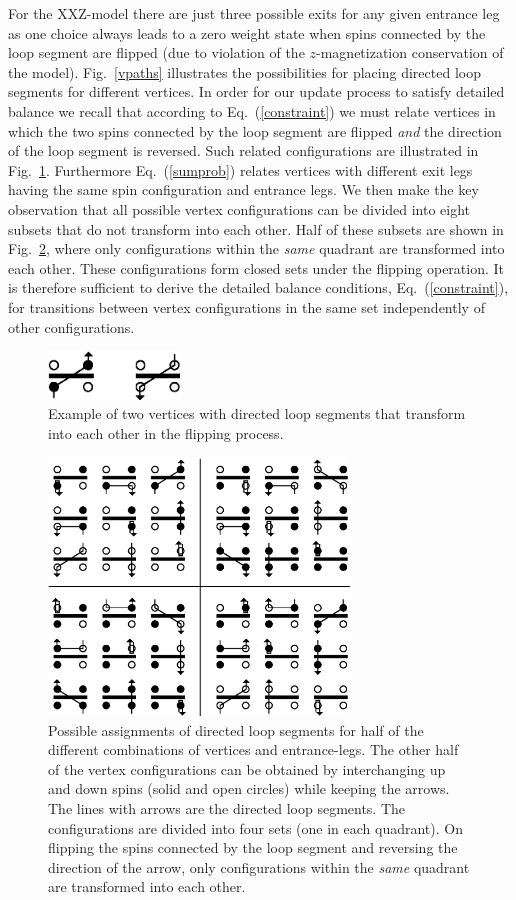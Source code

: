 \documentclass[10pt,pre,aps,twocolumn,showpacs,superscriptaddress,
floatfix]{revtex4}
\begin{document}
For the XXZ-model there are just three possible exits for any given entrance 
leg as one  choice always leads to a zero weight state when spins connected by
the loop segment are flipped (due to violation of the $z$-magnetization 
conservation of the model). Fig.~\ref{vpaths} illustrates the possibilities 
for placing directed loop segments for different vertices. 
In order for our update process to satisfy detailed balance we recall that
according to Eq.~(\ref{constraint}) we must relate vertices 
in which the two spins connected by the 
loop segment are flipped {\it and} the direction of the loop segment is 
reversed. Such related configurations are illustrated in Fig.~\ref{related}. 
Furthermore Eq.~(\ref{sumprob}) relates vertices with different
exit legs having the same spin configuration and entrance legs. We then make 
the key observation that all possible vertex configurations
can be divided into eight subsets that do not transform into each other. 
Half of these subsets are shown in Fig.~\ref{all}, where only configurations 
within the {\em same} quadrant are transformed into each other. 
These configurations form closed sets under the flipping operation. It is 
therefore sufficient to derive the detailed balance conditions, 
Eq.~(\ref{constraint}), for transitions between vertex
configurations in the same set independently of other configurations.

\begin{figure}
\includegraphics[clip,width=3.5cm]{fig7.eps}
\caption{Example of two vertices with directed loop segments 
that transform into each other in the 
flipping process.\label{related}}
\end{figure}

\begin{figure}
\includegraphics[clip,width=8cm]{fig8.eps}
\caption{Possible assignments of directed loop segments for half of the 
different combinations of vertices and entrance-legs. The other half of the 
vertex configurations can be obtained by interchanging up and down spins (solid
and open circles) while keeping the arrows. The lines with arrows are the 
directed loop segments. The configurations are divided into four sets 
(one in each quadrant). On flipping the spins connected by the loop segment 
and reversing the direction of the arrow, only configurations within the 
{\em same} quadrant are transformed into each other.
\label{all}}
\end{figure}
\end{document}
